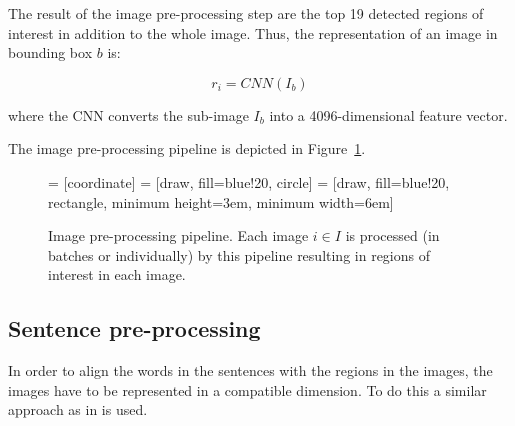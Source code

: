 The result of the image pre-processing step are the top 19 detected regions of interest in addition to the whole image. Thus, the representation of an image in bounding box $b$ is:

\begin{equation}
	r_i = CNN(I_b)
\end{equation}

where the CNN converts the sub-image $I_b$ into a 4096-dimensional feature vector.

The image pre-processing pipeline is depicted in Figure~\ref{fig:image-preprocessing}.

\begin{figure}
\centering  

 = [coordinate]
 = [draw, fill=blue!20, circle]
 = [draw, fill=blue!20, rectangle, 
    minimum height=3em, minimum width=6em]
    
\caption{Image pre-processing pipeline. Each image $i\in I$ is processed (in batches or individually) by this pipeline resulting in regions of interest in each image.}
\label{fig:image-preprocessing}
\end{figure}

\subsection{Sentence pre-processing}
In order to align the words in the sentences with the regions in the images, the images have to be represented in a compatible dimension. To do this a similar approach as in \cite{karpathyfeifei2014deep, karpathyjoulin2014deep, bahdanau2014neural} is used. 